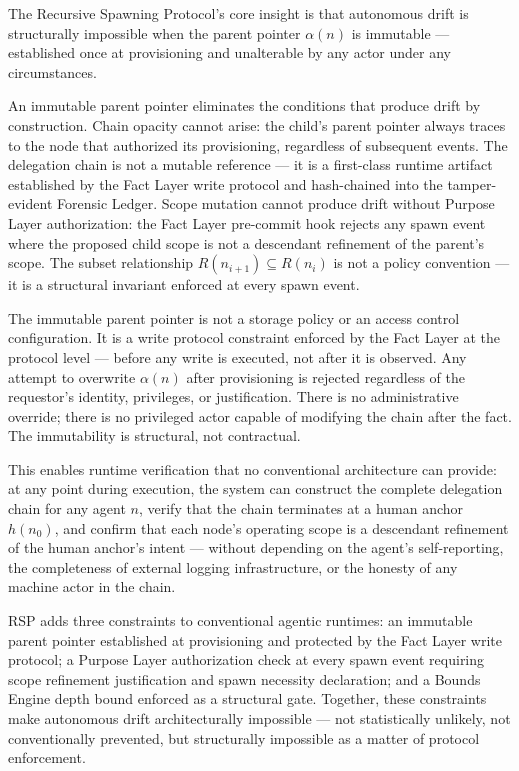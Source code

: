The Recursive Spawning Protocol's core insight is that autonomous drift is structurally impossible when the parent pointer $\alpha(n)$ is immutable — established once at provisioning and unalterable by any actor under any circumstances.

An immutable parent pointer eliminates the conditions that produce drift by construction. Chain opacity cannot arise: the child's parent pointer always traces to the node that authorized its provisioning, regardless of subsequent events. The delegation chain is not a mutable reference — it is a first-class runtime artifact established by the Fact Layer write protocol and hash-chained into the tamper-evident Forensic Ledger. Scope mutation cannot produce drift without Purpose Layer authorization: the Fact Layer pre-commit hook rejects any spawn event where the proposed child scope is not a descendant refinement of the parent's scope. The subset relationship $R(n_{i+1}) \subseteq R(n_i)$ is not a policy convention — it is a structural invariant enforced at every spawn event.

The immutable parent pointer is not a storage policy or an access control configuration. It is a write protocol constraint enforced by the Fact Layer at the protocol level — before any write is executed, not after it is observed. Any attempt to overwrite $\alpha(n)$ after provisioning is rejected regardless of the requestor's identity, privileges, or justification. There is no administrative override; there is no privileged actor capable of modifying the chain after the fact. The immutability is structural, not contractual.

This enables runtime verification that no conventional architecture can provide: at any point during execution, the system can construct the complete delegation chain for any agent $n$, verify that the chain terminates at a human anchor $h(n_0)$, and confirm that each node's operating scope is a descendant refinement of the human anchor's intent — without depending on the agent's self-reporting, the completeness of external logging infrastructure, or the honesty of any machine actor in the chain.

RSP adds three constraints to conventional agentic runtimes: an immutable parent pointer established at provisioning and protected by the Fact Layer write protocol; a Purpose Layer authorization check at every spawn event requiring scope refinement justification and spawn necessity declaration; and a Bounds Engine depth bound enforced as a structural gate. Together, these constraints make autonomous drift architecturally impossible — not statistically unlikely, not conventionally prevented, but structurally impossible as a matter of protocol enforcement.

